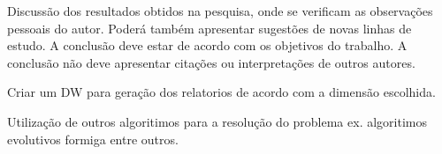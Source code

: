 

\iniciocapitulo
Discussão dos resultados obtidos na pesquisa, onde se verificam as observações pessoais do autor. Poderá também apresentar sugestões de novas linhas de estudo. A conclusão deve estar de acordo com os objetivos do trabalho. A conclusão não deve apresentar citações ou interpretações de outros autores.


Criar um DW para geração dos relatorios de acordo com a dimensão escolhida.

Utilização de outros algoritimos para a resolução do problema ex. algoritimos evolutivos formiga entre outros.